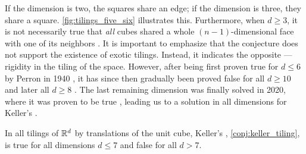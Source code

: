 \documentclass[../thesis.tex]{subfiles}
\begin{document}
If the dimension is two, the squares share an edge; if the dimension is three, they share a square. \cref{fig:tilings_five_six} illustrates this. Furthermore, when $d\geq 3$, it is not necessarily true that \emph{all} cubes shared a whole $(n-1)$-dimensional face with one of its neighbors \cite{perronUeberLueckenloseAusfuellung1940}. It is important to emphasize that the conjecture does not support the existence of exotic tilings. Instead, it indicates the opposite — rigidity in the tiling of the space. %
However, after being first proven true for $d\leq 6$ by Perron in 1940 \cite{perronModulartigeLueckenloseAusfuellung1940,perronModulartigeLueckenloseAusfuellung1940a}, it has since then gradually been proved false for all $d\geq10$ \cite{lagariasKellerCubetilingConjecture1992} and later all $d\geq8$ \cite{mackeyCubeTilingDimension2002}. The last remaining dimension was finally solved in 2020, where it was proven to be true \cite{brakensiekResolutionKellerConjecture2020}, leading us to a solution in all dimensions for Keller's .%

\begin{theorem}
    In all tilings of $\mathbb{R}^d$ by translations of the unit cube, Keller's , \cref{conj:keller_tiling}, is true for all dimensions $d\leq 7$ and false for all $d>7$.
\end{theorem}
\end{document}

